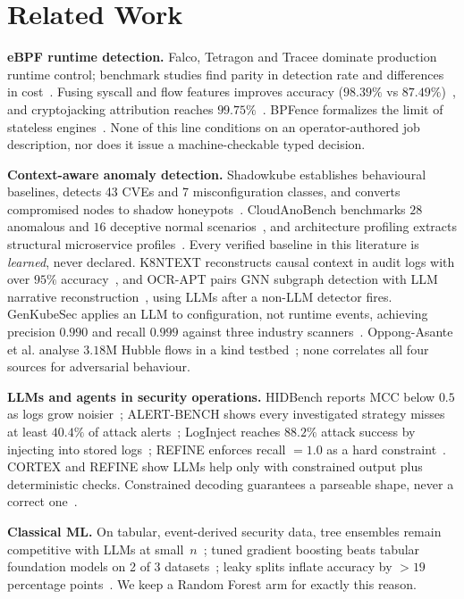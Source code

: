 \documentclass[conference]{IEEEtran}
\begin{document}
\section{Related Work}
\textbf{eBPF runtime detection.} Falco, Tetragon and Tracee dominate production runtime control; benchmark studies find parity in detection rate and differences in cost~\cite{syairozi2025}. Fusing syscall and flow features improves accuracy ($98.39\%$ vs $87.49\%$)~\cite{ryu2026}, and cryptojacking attribution reaches $99.75\%$~\cite{kim2025}. BPFence formalizes the limit of stateless engines~\cite{galletta2026}. None of this line conditions on an operator-authored job description, nor does it issue a machine-checkable typed decision.

\textbf{Context-aware anomaly detection.} Shadowkube establishes behavioural baselines, detects 43 CVEs and 7 misconfiguration classes, and converts compromised nodes to shadow honeypots~\cite{chen2025}. CloudAnoBench benchmarks $28$ anomalous and $16$ deceptive normal scenarios~\cite{zou2025}, and architecture profiling extracts structural microservice profiles~\cite{fraknil2026}. Every verified baseline in this literature is \emph{learned}, never declared. K8NTEXT reconstructs causal context in audit logs with over $95\%$ accuracy~\cite{franzil2026}, and OCR-APT pairs GNN subgraph detection with LLM narrative reconstruction~\cite{aly2025}, using LLMs after a non-LLM detector fires. GenKubeSec applies an LLM to configuration, not runtime events, achieving precision $0.990$ and recall $0.999$ against three industry scanners~\cite{genkubesec2024}. Oppong-Asante et al. analyse $3.18$M Hubble flows in a kind testbed~\cite{oppongrasante2026}; none correlates all four sources for adversarial behaviour.

\textbf{LLMs and agents in security operations.} HIDBench reports MCC below $0.5$ as logs grow noisier~\cite{sun2026bench}; ALERT-BENCH shows every investigated strategy misses at least $40.4\%$ of attack alerts~\cite{tssegai2026}; LogInject reaches $88.2\%$ attack success by injecting into stored logs~\cite{loginject2026}; REFINE enforces recall $=1.0$ as a hard constraint~\cite{chen2026refine}. CORTEX and REFINE show LLMs help only with constrained output plus deterministic checks. Constrained decoding guarantees a parseable shape, never a correct one~\cite{garware2026parser,ray2026}.

\textbf{Classical ML.} On tabular, event-derived security data, tree ensembles remain competitive with LLMs at small~$n$~\cite{grinsztajn2022,pavlidis2025}; tuned gradient boosting beats tabular foundation models on 2 of 3 datasets~\cite{polas2026}; leaky splits inflate accuracy by $>19$ percentage points~\cite{chakravorty2026}. We keep a Random Forest arm for exactly this reason.
\end{document}

